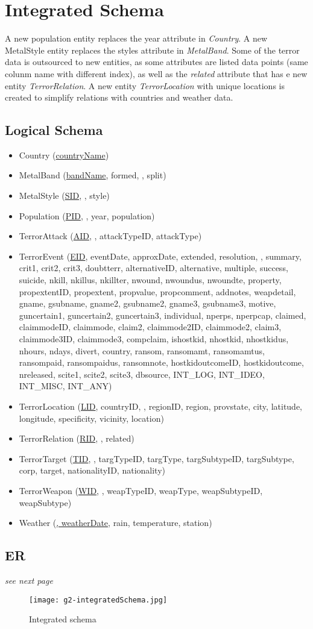 \section{Integrated Schema}
A new population entity replaces the year attribute in \emph{Country}. A new MetalStyle entity replaces the styles attribute in \emph{MetalBand}. Some of the terror data is outsourced to new entities, as some attributes are listed data points (same colunm name with different index), as well as the \emph{related} attribute that has e new entity \emph{TerrorRelation}. A new entity \emph{TerrorLocation} with unique locations is created to simplify relations with countries and weather data.
    
\subsection{Logical Schema}
\begin{itemize}
\item Country (\underline{countryName})
\item MetalBand (\underline{bandName}, formed, , split)
\item MetalStyle (\underline{SID}, , style)
\item Population (\underline{PID}, , year, population)
\item TerrorAttack (\underline{AID}, , attackTypeID, attackType)
\item TerrorEvent (\underline{EID}, eventDate, approxDate, extended, resolution, , summary, crit1, crit2, crit3, doubtterr, alternativeID, alternative, multiple, success, suicide, nkill, nkillus, nkillter, nwound, nwoundus, nwoundte, property, propextentID, propextent, propvalue, propcomment, addnotes, weapdetail, gname, gsubname, gname2, gsubname2, gname3, gsubname3, motive, guncertain1, guncertain2, guncertain3, individual, nperps, nperpcap, claimed, claimmodeID, claimmode, claim2, claimmode2ID, claimmode2, claim3, claimmode3ID, claimmode3, compclaim, ishostkid, nhostkid, nhostkidus, nhours, ndays, divert, country, ransom, ransomamt, ransomamtus, ransompaid, ransompaidus, ransomnote, hostkidoutcomeID, hostkidoutcome, nreleased, scite1, scite2, scite3, dbsource, INT\_LOG, INT\_IDEO, INT\_MISC, INT\_ANY)
\item TerrorLocation (\underline{LID}, countryID, , regionID, region, provstate, city, latitude, longitude, specificity, vicinity, location)
\item TerrorRelation (\underline{RID}, , {related})
\item TerrorTarget (\underline{TID}, , targTypeID, targType, targSubtypeID, targSubtype, corp, target, nationalityID, nationality)
\item TerrorWeapon (\underline{WID}, , weapTypeID, weapType, weapSubtypeID, weapSubtype)
\item Weather (\underline{, weatherDate}, rain, temperature, station)
\end{itemize}

\subsection{ER}
\emph{see next page}
\begin{figure}[hbt!]
	\centering
	\texttt{[image: g2-integratedSchema.jpg]}
	\caption{Integrated schema}
\end{figure}

\newpage